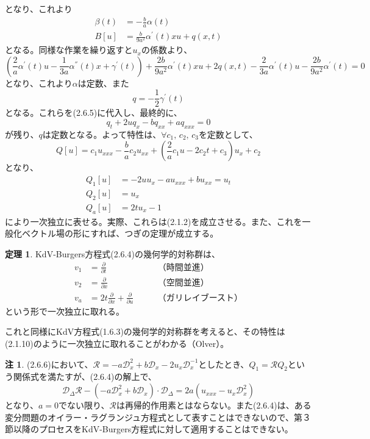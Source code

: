 \documentclass[a4paper, 11pt]{report}
\theoremstyle{definition}
\newtheorem{theorem}{定理}[section]
\newtheorem{remark}{注}[section]
\begin{document}
となり、これより
\begin{align*}
\beta (t) &= -\frac{b}{a} \alpha (t)\\
B[u] &= \frac{b}{9a^2} \alpha ^{'}(t)xu + q(x, t)
\end{align*}
となる。同様な作業を繰り返すと$u_{x}$の係数より、
\begin{equation*}
(\frac{2}{a} \alpha ^{'}(t)u - \frac{1}{3a} \alpha ^{''}(t)x + \gamma ^{'}(t)) + \frac{2b}{9a^2} \alpha ^{'}(t)xu + 2q(x, t) - \frac{2}{3a} \alpha ^{'}(t)u - \frac{2b}{9a^2} \alpha ^{'}(t) = 0
\end{equation*}
となり、これより$\alpha$は定数、また
\begin{equation*}
q = -\frac{1}{2} \gamma ^{'}(t)
\end{equation*}
となる。これらを(2.6.5)に代入し、最終的に、
\begin{equation*}
q_t + 2uq_{x} - b q_{xx} + a q_{xxx} = 0
\end{equation*}
が残り、$q$は定数となる。よって特性は、$\forall c_1,\, c_2,\, c_3$を定数として、
\begin{equation*}
Q[u] = c_1u_{xxx} - \frac{b}{a} c_2u_{xx} + (\frac{2}{a} c_1u - 2c_2t + c_3)u_{x} + c_2
\end{equation*}
となり、
\begin{align}
Q_1[u] &= -2uu_{x} - a u_{xxx} + b u_{xx} = u_t \nonumber \\
Q_2[u] &= u_{x} \nonumber \\
Q_a[u] &= 2tu_{x} - 1  %
\end{align}
により一次独立に表せる。実際、これらは(2.1.2)を成立させる。また、これを一般化ベクトル場の形にすれば、つぎの定理が成立する。

\begin{theorem}
 KdV-Burgers方程式(2.6.4)の幾何学的対称群は、
\begin{align*}
v_1 &= \frac{\partial}{\partial t} \qquad &\text{（時間並進）}\\
v_2 &= \frac{\partial}{\partial x} \qquad &\text{（空間並進）}\\
v_a &= 2t\frac{\partial}{\partial x} + \frac{\partial}{\partial u} \qquad &\text{（ガリレイブースト）}
\end{align*}
という形で一次独立に取れる。
\end{theorem}

 これと同様にKdV方程式(1.6.3)の幾何学的対称群を考えると、その特性は(2.1.10)のように一次独立に取れることがわかる（Olver\cite[Chap.2]{Olver4}）。

\begin{remark}
 (2.6.6)において、$\mathcal{R}=-a\mathcal{D}_x^2+b\mathcal{D}_x-2u_x\mathcal{D}_x^{-1}$としたとき、$Q_1=\mathcal{R}Q_2$という関係式を満たすが、(2.6.4)の解上で、
\begin{equation*}
\mathcal{D}_{\Delta}\mathcal{R} - (-a\mathcal{D}_x^2+b\mathcal{D}_x)\cdot\mathcal{D}_{\Delta} = 2a(u_{xxx}-u_x\mathcal{D}_x^2)
\end{equation*}
となり、$a=0$でない限り、$\mathcal{R}$は再帰的作用素とはならない。また(2.6.4)は、ある変分問題のオイラー・ラグランジュ方程式として表すことはできないので、第３節以降のプロセスをKdV-Burgers方程式に対して適用することはできない。
\end{remark}
\end{document}
